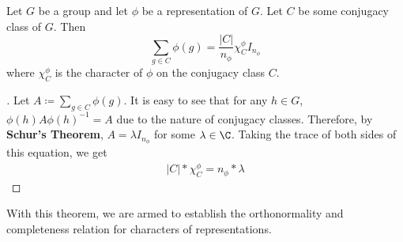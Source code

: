 \begin{theorem}
	Let $G$ be a group and let $\phi$ be a representation of $G$. Let $C$ be some conjugacy class of $G$. Then 
$$\sum_{g\in C} \phi(g) =\frac{|C|}{n_\phi} \chi^\phi_C I_{n_\phi}$$
where $\chi^\phi_C$ is the character of $\phi$ on the conjugacy class $C$.
\end{theorem}
\begin{proof}[\cite{Tung}] Let $A\coloneq \sum_{g\in C} \phi(g)$. It is easy to see that for any $h\in G$, $\phi(h)A\phi(h)^{-1} = A$ due to the nature of conjugacy classes. Therefore, by \textbf{Schur's Theorem}, $A = \lambda I_{n_\phi}$ for some $\lambda \in \C$. Taking the trace of both sides of this equation, we get 
\begin{equation}
	\begin{aligned}
		|C| * \chi_C^\phi = n_\phi * \lambda 
	\end{aligned}
\end{equation}
\end{proof}

With this theorem, we are armed to establish the orthonormality and completeness relation for characters of representations.

